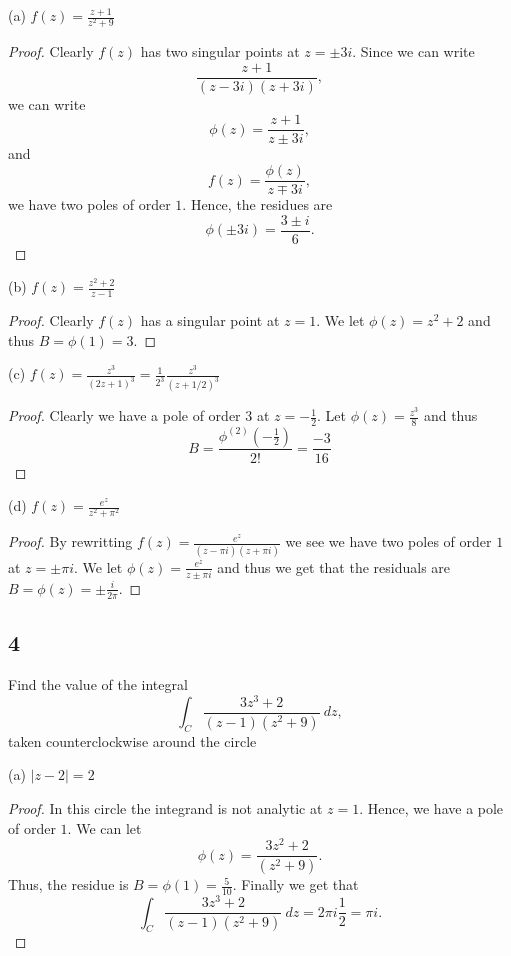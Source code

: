 \documentclass{article}
\begin{document}
(a) $f(z) = \frac{z + 1}{z^2 + 9}$
\begin{proof}
    Clearly $f(z)$ has two singular points at $z = \pm 3i$. Since we can write
    \[\frac{z + 1}{(z-3i)(z+3i)},\]
    we can write
    \begin{equation*}
        \phi(z) = \frac{z + 1}{z \pm 3i},
    \end{equation*}
    and
    \begin{equation*}
        f(z) = \frac{\phi(z)}{z \mp 3i},
    \end{equation*}
    we have two poles of order $1$. Hence, the residues are
    \[\phi(\pm 3i) = \frac{3 \pm i}{6}.\]
\end{proof}

(b) $f(z) = \frac{z^2 + 2}{z - 1}$
\begin{proof}
    Clearly $f(z)$ has a singular point at $z = 1$. We let $\phi(z) = z^2 + 2$
    and thus $B = \phi(1) = 3$.
\end{proof}

(c) $f(z) = \frac{z^3}{(2z + 1)^3} = \frac{1}{2^3}\frac{z^3}{(z + 1/2)^3}$
\begin{proof}
    Clearly we have a pole of order $3$ at $z = -\frac{1}{2}$.
    Let $\phi(z) = \frac{z^3}{8}$
    and thus
    \[B = \frac{\phi^{(2)}(-\frac{1}{2})}{2!} = \frac{-3}{16}\]
\end{proof}

(d) $f(z) = \frac{e^z}{z^2 + \pi^2}$
\begin{proof}
    By rewritting $f(z) = \frac{e^z}{(z - \pi i)(z + \pi i)}$ we see we have
    two poles of order $1$ at $z = \pm \pi i$.
    We let $\phi(z) = \frac{e^z}{z \pm \pi i}$ and thus we get that the residuals
    are $B = \phi(z) = \pm \frac{i}{2\pi}$.
\end{proof}

\subsection*{4}
Find the value of the integral
\[\int_C \frac{3z^3 + 2}{(z-1)(z^2 + 9)} \ dz,\]
taken counterclockwise around the circle

(a) $|z - 2| = 2$
\begin{proof}
    In this circle the integrand is not analytic at $z = 1$. Hence,
    we have a pole of order $1$. We can let
    \[\phi(z) = \frac{3z^2+2}{(z^2 + 9)}.\]
    Thus, the residue is $B = \phi(1) = \frac{5}{10}$. Finally we get that
    \[\int_C \frac{3z^3 + 2}{(z-1)(z^2 + 9)} \ dz = 2\pi i \frac{1}{2} = \pi i.\]
\end{proof}
\end{document}
